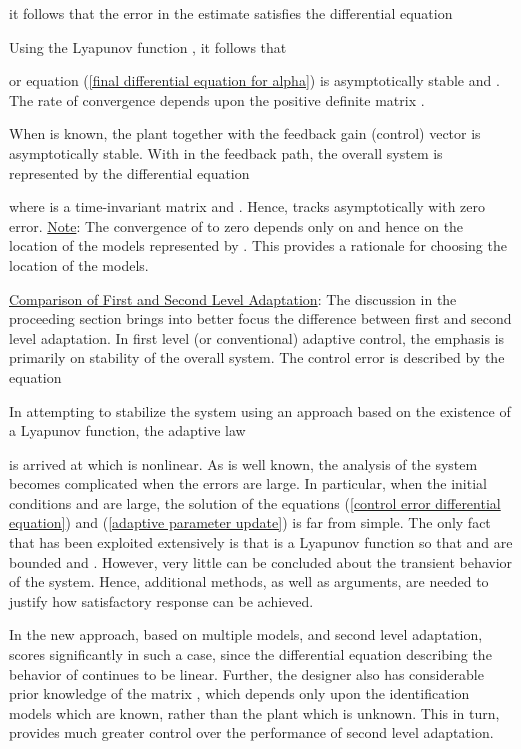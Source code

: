 \documentclass[conference]{IEEEtran}
\begin{document}
it follows that the error in the estimate  satisfies the differential equation

Using the Lyapunov function , it follows that

or equation (\ref{final differential equation for alpha}) is asymptotically stable and . The rate of convergence depends upon the positive definite matrix .

When  is known, the plant together with the feedback gain (control) vector  is asymptotically stable. With  in the feedback path, the overall system is represented by the differential equation

where  is a time-invariant matrix and . Hence,  tracks  asymptotically with zero error.
{\large \underline{Note}}: The convergence of  to zero depends only on  and hence on the location of the  models represented by . This provides a rationale for choosing the location of the models.

{\large \underline{Comparison of First and Second Level Adaptation}}: The discussion in the proceeding section brings into better focus the difference between first and second level adaptation. In first level (or conventional) adaptive control, the emphasis is primarily on stability of the overall system. The control error is described by the equation

In attempting to stabilize the system using an approach based on the existence of a Lyapunov function, the adaptive law

is arrived at which is nonlinear. As is well known, the analysis of the system becomes complicated when the errors are large. In particular, when the initial conditions  and  are large, the solution of the equations (\ref{control error differential equation}) and (\ref{adaptive parameter update}) is far from simple. The only fact that has been exploited extensively is that  is a Lyapunov function so that  and  are bounded and . However, very little can be concluded about the transient behavior of the system. Hence, additional methods, as well as arguments, are needed to justify how satisfactory response can be achieved.

 In the new approach, based on multiple models, and second level adaptation, scores significantly in such a case, since the differential equation describing the behavior of  continues to be linear. Further, the designer also has considerable prior knowledge of the matrix , which depends only upon the identification models which are known, rather than the plant which is unknown. This in turn, provides much greater control over the performance of second level adaptation.
\end{document}
